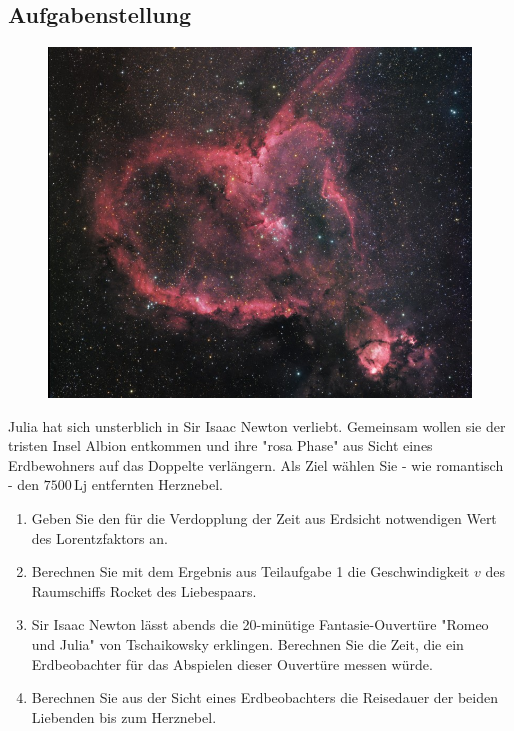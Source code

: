 \documentclass[a4paper]{report}
\begin{document}
\subsection{Aufgabenstellung}
\begin{figure}[h]
	\centering
	\includegraphics[scale=.5]{images/Heart_Nebula.jpeg}
	\end{figure}
\begin{flushleft}
	Julia hat sich unsterblich in Sir Isaac Newton verliebt. Gemeinsam wollen sie der tristen Insel Albion entkommen und ihre "rosa Phase" aus Sicht eines Erdbewohners auf das Doppelte verlängern. Als Ziel wählen Sie - wie romantisch - den \(7500 \, \text{Lj}\) entfernten Herznebel.
\begin{enumerate}
    \item Geben Sie den für die Verdopplung der Zeit aus Erdsicht notwendigen Wert des Lorentzfaktors an.
    \item Berechnen Sie mit dem Ergebnis aus Teilaufgabe 1 die Geschwindigkeit \(v\) des Raumschiffs Rocket des Liebespaars.
    \item Sir Isaac Newton lässt abends die 20-minütige Fantasie-Ouvertüre "Romeo und Julia" von Tschaikowsky erklingen. Berechnen Sie die Zeit, die ein Erdbeobachter für das Abspielen dieser Ouvertüre messen würde.
    \item Berechnen Sie aus der Sicht eines Erdbeobachters die Reisedauer der beiden Liebenden bis zum Herznebel.
\end{enumerate}
\end{flushleft}
\end{document}
